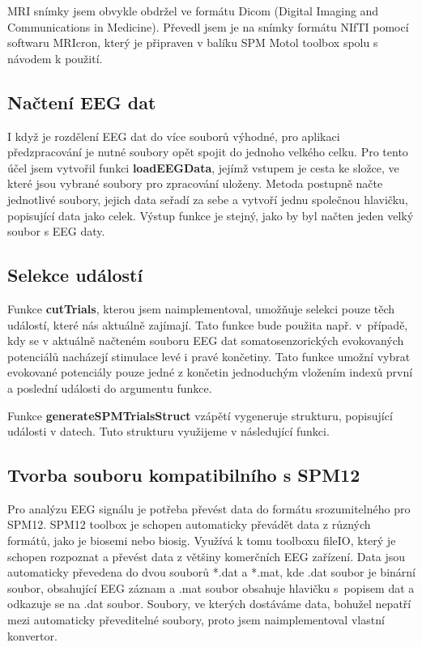 MRI snímky jsem obvykle obdržel ve formátu Dicom (Digital Imaging and Communications in Medicine). Převedl jsem je na snímky formátu NIfTI pomocí softwaru MRIcron, který je připraven v balíku SPM Motol toolbox spolu s návodem k použití.


\subsection{Načtení EEG dat}
I když je rozdělení EEG dat do více souborů výhodné, pro aplikaci předzpracování je nutné soubory opět spojit do jednoho velkého celku. Pro tento účel jsem vytvořil funkci \textbf{loadEEGData}, jejímž vstupem je cesta ke složce, ve které jsou vybrané soubory pro zpracování uloženy. Metoda postupně načte jednotlivé soubory, jejich data seřadí za sebe a vytvoří jednu společnou hlavičku, popisující data jako celek. Výstup funkce je stejný, jako by byl načten jeden velký soubor s EEG daty.

\subsection{Selekce událostí}
Funkce \textbf{cutTrials}, kterou jsem naimplementoval, umožňuje selekci pouze těch událostí, které nás aktuálně zajímají.
Tato funkce bude použita např. v~případě, kdy se v aktuálně načteném souboru EEG dat somatosenzorických evokovaných potenciálů nacházejí stimulace levé i pravé končetiny. Tato funkce umožní vybrat evokované potenciály pouze jedné z končetin jednoduchým vložením indexů první a poslední události do argumentu funkce.

Funkce \textbf{generateSPMTrialsStruct} vzápětí vygeneruje strukturu, popisující události v datech. Tuto strukturu využijeme v následující funkci.


\subsection{Tvorba souboru kompatibilního s SPM12}
\label{tvorbaSPMsouboru}
Pro analýzu EEG signálu je potřeba převést data do formátu srozumitelného pro SPM12. SPM12 toolbox je schopen automaticky převádět data z různých formátů, jako je biosemi nebo biosig. Využívá k tomu toolboxu fileIO, který je schopen rozpoznat a převést data z většiny komerčních EEG zařízení. Data jsou automaticky převedena do dvou souborů *.dat a *.mat, kde .dat soubor je binární soubor, obsahující EEG záznam a .mat soubor obsahuje hlavičku s~popisem dat a odkazuje se na .dat soubor. Soubory, ve kterých dostáváme data, bohužel nepatří mezi automaticky převeditelné soubory, proto jsem naimplementoval vlastní konvertor. 

